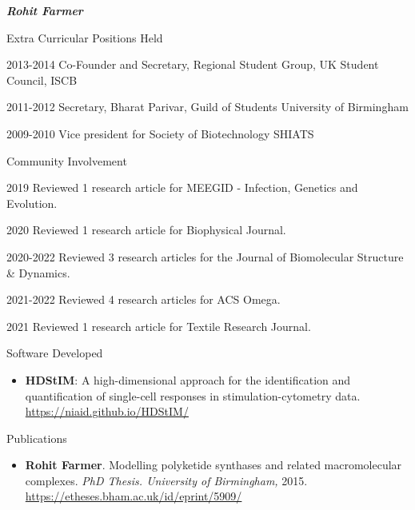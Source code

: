 \documentclass[10pt]{article}
\begin{document}
\begin{cv}{\huge \it \bfseries Rohit Farmer}
\vskip3pt
\begin{cvlist}{Extra Curricular Positions Held}
	\item[2013-2014] Co-Founder and Secretary, Regional Student Group, UK \hfill Student Council, ISCB
	\item[2011-2012] Secretary, Bharat Parivar, Guild of Students \hfill University of Birmingham
	\item[2009-2010] Vice president for Society of Biotechnology \hfill SHIATS
\end{cvlist}

\vskip3pt
\begin{cvlist}{Community Involvement}
        \item[2019] Reviewed 1 research article for MEEGID - Infection, Genetics and Evolution.
        \item[2020] Reviewed 1 research article for Biophysical Journal.
        \item[2020-2022] Reviewed 3 research articles for the Journal of Biomolecular Structure \& Dynamics.
        \item[2021-2022] Reviewed 4 research articles for ACS Omega.
        \item[2021] Reviewed 1 research article for Textile Research Journal.
\end{cvlist}

\renewenvironment{thebibliography}[1]{
\setlength{\topsep}{0em}
\setlength{\labelsep}{.5em}
\begin{etaremune}{
\setlength{\itemsep}{0.5em}}
}{\end{etaremune}}
\renewcommand{\bibitem}[1]{\item}

\setlength{\cvlabelsep}{0mm}
\setlength{\cvlabelwidth}{0mm}
\renewcommand{\labelitemi}{}

\vskip3pt
\begin{cvlist}{Software Developed}
	\item {\begin{itemize}
			\item{\bf HDStIM}: A high-dimensional approach for the identification and quantification of single-cell responses in stimulation-cytometry data. \url{https://niaid.github.io/HDStIM/}
                \end{itemize}}
\end{cvlist}

\newpage
\vskip3pt
\begin{cvlist}{Publications}
\item {\begin{itemize}\item{\bf Rohit Farmer}. Modelling polyketide synthases and related macromolecular complexes. \emph{PhD Thesis. University of Birmingham,} 2015. \url{https://etheses.bham.ac.uk/id/eprint/5909/} \end{itemize}}


\end{cvlist}
\end{cv}
\end{document}
